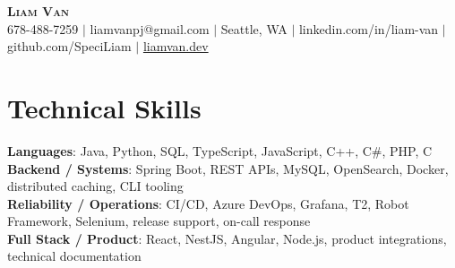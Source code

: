 \documentclass[letterpaper,11pt]{article}
\begin{document}

%
\begin{center}
    \textbf{\Huge \scshape Liam Van} \\ \vspace{1pt}
    \small 678-488-7259 $|$ \small {liamvanpj@gmail.com} $|$ Seattle, WA
 {{$|$ linkedin.com/in/liam-van} {$|$ github.com/SpeciLiam} {$|$ \href{https://liamvan.dev}{liamvan.dev}}}

\end{center}

\section{Technical Skills}
 \begin{itemize}[leftmargin=0.15in, label={}]
    \small{\item{
     \textbf{Languages}{: Java, Python, SQL, TypeScript, JavaScript, C++, C\#, PHP, C} \\
     \textbf{Backend / Systems}{: Spring Boot, REST APIs, MySQL, OpenSearch, Docker, distributed caching, CLI tooling} \\
     \textbf{Reliability / Operations}{: CI/CD, Azure DevOps, Grafana, T2, Robot Framework, Selenium, release support, on-call response} \\
     \textbf{Full Stack / Product}{: React, NestJS, Angular, Node.js, product integrations, technical documentation} \\
    }}
 \end{itemize}
%

\end{document}
